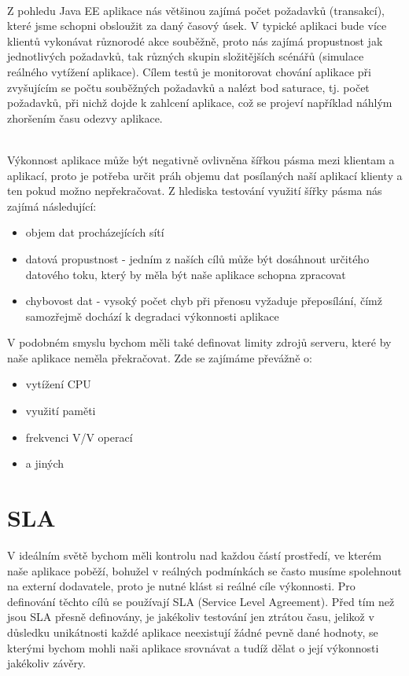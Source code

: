 \documentclass[122pt,oneside]{fithesis}
\begin{document}
\vspace{5 mm}
\\\indent Z pohledu Java EE aplikace nás většinou zajímá počet požadavků (transakcí), které jsme schopni obsloužit za daný časový úsek. V typické aplikaci bude více klientů vykonávat různorodé akce souběžně, proto nás zajímá propustnost jak jednotlivých požadavků, tak různých skupin složitějších scénářů (simulace reálného vytížení aplikace). Cílem testů je monitorovat chování aplikace při zvyšujícím se počtu souběžných požadavků a nalézt bod saturace, tj. počet požadavků, při nichž dojde k zahlcení aplikace, což se projeví například náhlým zhoršením času odezvy aplikace. 

\vspace{5 mm}
\\\indent Výkonnost aplikace může být negativně ovlivněna šířkou pásma mezi klientam a aplikací, proto je potřeba určit práh objemu dat posílaných naší aplikací klienty a ten pokud možno nepřekračovat. Z hlediska testování využití šířky pásma nás zajímá následující:
\begin{itemize}
  \item objem dat procházejících sítí
  \item datová propustnost - jedním z naších cílů může být dosáhnout určitého datového toku, který by měla být naše aplikace schopna zpracovat
  \item chybovost dat - vysoký počet chyb při přenosu vyžaduje přeposílání, čímž samozřejmě dochází k degradaci výkonnosti aplikace
\end{itemize}
V podobném smyslu bychom měli také definovat limity zdrojů serveru, které by naše aplikace neměla překračovat. Zde se zajímáme převážně o:
\begin{itemize}
  \item vytížení CPU
  \item využití paměti
  \item frekvenci V/V operací
  \item a jiných
\end{itemize}

\section{SLA}
V ideálním světě bychom měli kontrolu nad každou částí prostředí, ve kterém naše aplikace poběží, bohužel v reálných podmínkách se často musíme spolehnout na externí dodavatele, proto je nutné klást si reálné cíle výkonnosti. Pro definování těchto cílů se používají SLA (Service Level Agreement). Před tím než jsou SLA přesně definovány, je jakékoliv testování jen ztrátou času, jelikož v důsledku unikátnosti každé aplikace neexistují žádné pevně dané hodnoty, se kterými bychom mohli naši aplikace srovnávat a tudíž dělat o její výkonnosti jakékoliv závěry.
\end{document}
